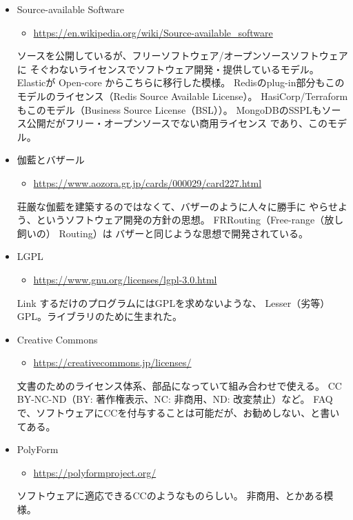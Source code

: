 \documentclass{jsarticle}
\newcommand{\duallicense}{デュアル・ライセンス}
\newcommand{\freesoftware}{フリーソフトウェア}
\newcommand{\opensourcesoftware}{オープンソースソフトウェア}
\newcommand{\freesoftoss}{\freesoftware{}/\opensourcesoftware{}}
\begin{document}
\begin{itemize}
\duallicense{}でビジネス・商用利用もしつつ、
ベース部分を\opensourcesoftware{}とするビジネスモデル。
Kafka, Cassandra, Oracle/MySQL, Eucalyptus, GitLab, Redis
などが該当するらしい。

\item Source-available Software
\begin{itemize}
\item \url{https://en.wikipedia.org/wiki/Source-available_software}
\end{itemize}

ソースを公開しているが、\freesoftoss{}に
そぐわないライセンスでソフトウェア開発・提供しているモデル。
Elasticが Open-core からこちらに移行した模様。
Redisのplug-in部分もこのモデルのライセンス（Redis Source Available License）。
HasiCorp/Terraformもこのモデル（Business Source License（BSL））。
MongoDBのSSPLもソース公開だがフリー・オープンソースでない商用ライセンス
であり、このモデル。

\item 伽藍とバザール
\begin{itemize}
\item \url{https://www.aozora.gr.jp/cards/000029/card227.html}
\end{itemize}

荘厳な伽藍を建築するのではなくて、バザーのように人々に勝手に
やらせよう、というソフトウェア開発の方針の思想。
FRRouting（Free-range（放し飼いの） Routing）は
バザーと同じような思想で開発されている。

\item LGPL
\begin{itemize}
\item \url{https://www.gnu.org/licenses/lgpl-3.0.html}
\end{itemize}

Link するだけのプログラムにはGPLを求めないような、
Lesser（劣等）GPL。ライブラリのために生まれた。

\item Creative Commons
\begin{itemize}
\item \url{https://creativecommons.jp/licenses/}
\end{itemize}

文書のためのライセンス体系、部品になっていて組み合わせで使える。
CC BY-NC-ND（BY: 著作権表示、NC: 非商用、ND: 改変禁止）など。
FAQで、ソフトウェアにCCを付与することは可能だが、お勧めしない、と書いてある。

\item PolyForm
\begin{itemize}
\item \url{https://polyformproject.org/}
\end{itemize}

ソフトウェアに適応できるCCのようなものらしい。
非商用、とかある模様。

\end{itemize}
\end{document}
